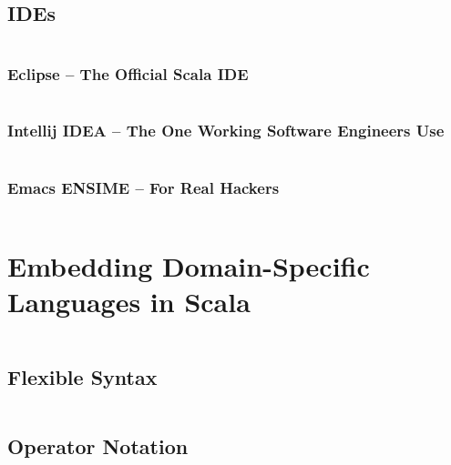 \subsection{IDEs}

\begin{lstlisting}[language=Scala]
\end{lstlisting}

\subsubsection{Eclipse -- The Official Scala IDE}

\begin{lstlisting}[language=Scala]
\end{lstlisting}

\subsubsection{Intellij IDEA -- The One Working Software Engineers Use}

\begin{lstlisting}[language=Scala]
\end{lstlisting}

\subsubsection{Emacs ENSIME -- For Real Hackers}

\begin{lstlisting}[language=Scala]
\end{lstlisting}

\section{Embedding Domain-Specific Languages in Scala}

\begin{lstlisting}[language=Scala]
\end{lstlisting}


\subsection{Flexible Syntax}

\begin{lstlisting}[language=Scala]
\end{lstlisting}

\subsection{Operator Notation}

